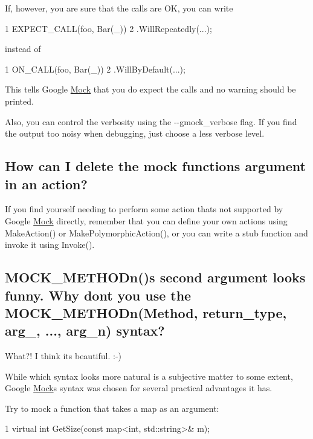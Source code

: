 If, however, you are sure that the calls are OK, you can write


\begin{DoxyCode}
1 EXPECT\_CALL(foo, Bar(\_))
2     .WillRepeatedly(...);
\end{DoxyCode}


instead of


\begin{DoxyCode}
1 ON\_CALL(foo, Bar(\_))
2     .WillByDefault(...);
\end{DoxyCode}


This tells Google \hyperlink{class_mock}{Mock} that you do expect the calls and no warning should be printed.

Also, you can control the verbosity using the {\ttfamily -\/-\/gmock\+\_\+verbose} flag. If you find the output too noisy when debugging, just choose a less verbose level.

\subsection*{How can I delete the mock function\textquotesingle{}s argument in an action?}

If you find yourself needing to perform some action that\textquotesingle{}s not supported by Google \hyperlink{class_mock}{Mock} directly, remember that you can define your own actions using Make\+Action() or Make\+Polymorphic\+Action(), or you can write a stub function and invoke it using Invoke().

\subsection*{M\+O\+C\+K\+\_\+\+M\+E\+T\+H\+O\+Dn()\textquotesingle{}s second argument looks funny. Why don\textquotesingle{}t you use the M\+O\+C\+K\+\_\+\+M\+E\+T\+H\+O\+Dn(Method, return\+\_\+type, arg\+\_, ..., arg\+\_\+n) syntax?}

What?! I think it\textquotesingle{}s beautiful. \+:-\/)

While which syntax looks more natural is a subjective matter to some extent, Google \hyperlink{class_mock}{Mock}\textquotesingle{}s syntax was chosen for several practical advantages it has.

Try to mock a function that takes a map as an argument\+: 
\begin{DoxyCode}
1 virtual int GetSize(const map<int, std::string>& m);
\end{DoxyCode}


